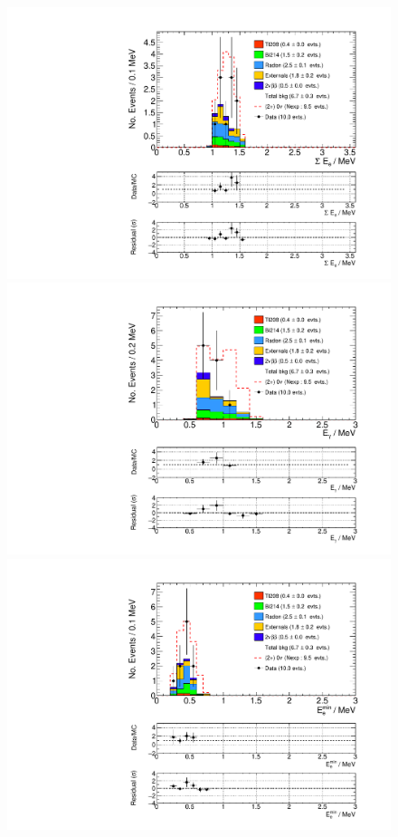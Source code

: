 \documentclass[main.tex]{subfiles}
\begin{document}
\begin{figure} [h!]
\begin{center}
\includegraphics[scale=0.36]{pictures/FinalResults/bb0nu2/150precut/SEe_bb0nu2.pdf}
\includegraphics[scale=0.36]{pictures/FinalResults/bb0nu2/150precut/Eg_bb0nu2.pdf}
\includegraphics[scale=0.36]{pictures/FinalResults/bb0nu2/150precut/Eemin_bb0nu2.pdf}

\end{center}
\end{figure}
\end{document}
